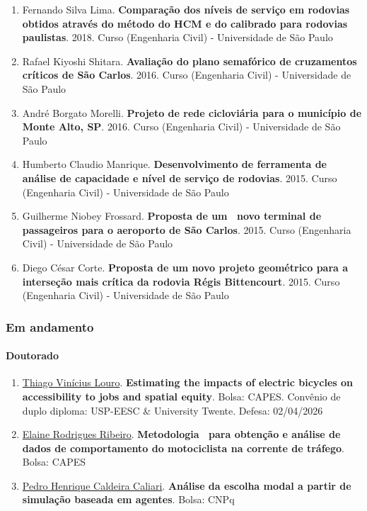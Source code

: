 \documentclass[
  brazilian,
  11pt,
  a4paper,
]{article}
\begin{document}
\begin{enumerate}
  Paulo
\item
  Fernando Silva Lima. \textbf{Comparação dos níveis de serviço em
  rodovias obtidos através do método do HCM e do calibrado para rodovias
  paulistas}. 2018. Curso (Engenharia Civil) - Universidade de São Paulo
\item
  Rafael Kiyoshi Shitara. \textbf{Avaliação do plano semafórico de
  cruzamentos críticos de São Carlos}. 2016. Curso (Engenharia Civil) -
  Universidade de São Paulo
\item
  André Borgato Morelli. \textbf{Projeto de rede cicloviária para o
  município de Monte Alto, SP}. 2016. Curso (Engenharia Civil) -
  Universidade de São Paulo
\item
  Humberto Claudio Manrique. \textbf{Desenvolvimento de ferramenta de
  análise de capacidade e nível de serviço de rodovias}. 2015. Curso
  (Engenharia Civil) - Universidade de São Paulo
\item
  Guilherme Niobey Frossard. \textbf{Proposta de um~ novo terminal de
  passageiros para o aeroporto de São Carlos}. 2015. Curso (Engenharia
  Civil) - Universidade de São Paulo
\item
  Diego César Corte. \textbf{Proposta de um novo projeto geométrico para
  a interseção mais crítica da rodovia Régis Bittencourt}. 2015. Curso
  (Engenharia Civil) - Universidade de São Paulo
\end{enumerate}

\subsubsection{Em andamento}\label{em-andamento}

\paragraph{Doutorado}\label{doutorado}

\begin{enumerate}
\def\labelenumi{\arabic{enumi}.}
\item
  \href{https://lattes.cnpq.br/2619402198229137}{Thiago Vinícius Louro}.
  \textbf{Estimating the impacts of electric bicycles on accessibility
  to jobs and spatial equity}. Bolsa: CAPES. Convênio de duplo diploma:
  USP-EESC \& University Twente. Defesa: 02/04/2026
\item
  \href{}{Elaine Rodrigues Ribeiro}. \textbf{Metodologia~ para obtenção
  e análise de dados de comportamento do motociclista na corrente de
  tráfego}. Bolsa: CAPES
\item
  \href{http://lattes.cnpq.br/7503266177637246}{Pedro Henrique Caldeira
  Caliari}. \textbf{Análise da escolha modal a partir de simulação
  baseada em agentes}. Bolsa: CNPq
\end{enumerate}
\end{document}

